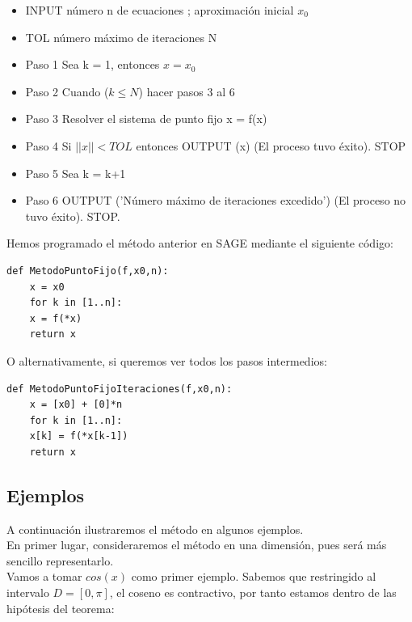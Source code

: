 \begin{itemize}
\item INPUT número n de ecuaciones ; aproximación inicial $x_0$ 
\item TOL número máximo de iteraciones N 
\item Paso 1	Sea k = 1, entonces $x = x_0$ 
\item Paso 2 Cuando ($k \leq N$) hacer pasos  3 al 6 
\item Paso 3 Resolver el sistema de punto fijo x = f(x) 
\item Paso 4 Si $||x|| < TOL $ entonces OUTPUT (x) (El proceso tuvo éxito). STOP 
\item Paso 5 Sea k = k+1 
\item Paso 6 OUTPUT ('Número máximo de iteraciones excedido') (El proceso no tuvo éxito). STOP.
\end{itemize}


Hemos programado el método anterior en SAGE mediante el siguiente código:

\begin{verbatim}
def MetodoPuntoFijo(f,x0,n):
	x = x0
	for k in [1..n]:
	x = f(*x)
	return x
\end{verbatim}

O alternativamente, si queremos ver todos los pasos intermedios:
\begin{verbatim}
def MetodoPuntoFijoIteraciones(f,x0,n):
	x = [x0] + [0]*n
	for k in [1..n]:
	x[k] = f(*x[k-1])
	return x
\end{verbatim}

\subsection{Ejemplos}

A continuación ilustraremos el método en algunos ejemplos. \\
En primer lugar, consideraremos el método en una dimensión, pues será más sencillo representarlo. \\
Vamos a tomar $cos(x)$ como primer ejemplo. Sabemos que restringido al intervalo $D = [0,\pi]$, el coseno es contractivo, por tanto estamos dentro de las hipótesis del teorema:

